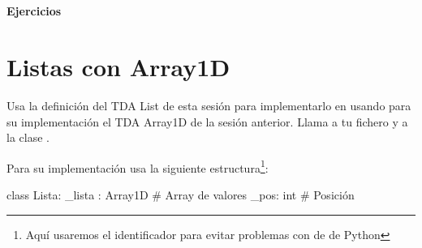 \


\


\centerline{\Large \bf Ejercicios}



\formatoEjercicio
 


\separacion
\section{Listas con Array1D} 

Usa la definición del TDA List de esta sesión para implementarlo
en  usando para su implementación el TDA Array1D de la sesión anterior.
Llama a tu fichero  y a la clase .

Para su implementación usa la siguiente estructura\footnote{Aquí usaremos el identificador  para evitar problemas con   de  de Python}:

\hfil
\begin{minipage}{.43\textwidth}
\begin{pyverbatim}[][frame=single]
class Lista: 
   _lista : Array1D # Array de valores
   _pos: int        # Posición 
\end{pyverbatim}
\end{minipage}

